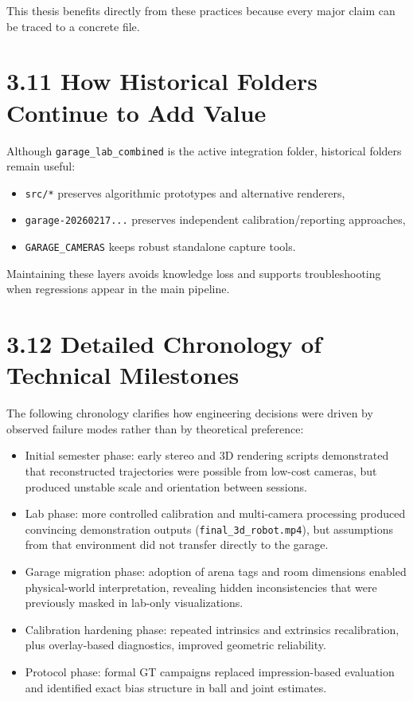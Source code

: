 This thesis benefits directly from these practices because every major claim can be traced to a concrete file.

\section{3.11 How Historical Folders Continue to Add Value}
Although \texttt{garage\_lab\_combined} is the active integration folder, historical folders remain useful:
\begin{itemize}
  \item \texttt{src/*} preserves algorithmic prototypes and alternative renderers,
  \item \texttt{garage-20260217...} preserves independent calibration/reporting approaches,
  \item \texttt{GARAGE\_CAMERAS} keeps robust standalone capture tools.
\end{itemize}

Maintaining these layers avoids knowledge loss and supports troubleshooting when regressions appear in the main pipeline.



\section{3.12 Detailed Chronology of Technical Milestones}
The following chronology clarifies how engineering decisions were driven by observed failure modes rather than by theoretical preference:

\begin{itemize}
  \item Initial semester phase: early stereo and 3D rendering scripts demonstrated that reconstructed trajectories were possible from low-cost cameras, but produced unstable scale and orientation between sessions.
  \item Lab phase: more controlled calibration and multi-camera processing produced convincing demonstration outputs (\texttt{final\_3d\_robot.mp4}), but assumptions from that environment did not transfer directly to the garage.
  \item Garage migration phase: adoption of arena tags and room dimensions enabled physical-world interpretation, revealing hidden inconsistencies that were previously masked in lab-only visualizations.
  \item Calibration hardening phase: repeated intrinsics and extrinsics recalibration, plus overlay-based diagnostics, improved geometric reliability.
  \item Protocol phase: formal GT campaigns replaced impression-based evaluation and identified exact bias structure in ball and joint estimates.
\end{itemize}

